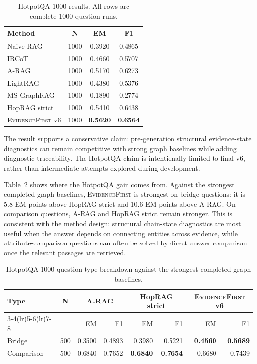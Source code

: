 \documentclass[runningheads]{llncs}
\newcommand{\sys}{\textsc{EvidenceFirst}\xspace}
\begin{document}
\begin{table}[t]
\centering
\caption{HotpotQA-1000 results. All rows are complete 1000-question runs.}
\label{tab:hotpot_main}
\small
\begin{tabular}{lccc}
\toprule
Method & N & EM & F1 \\
\midrule
Naive RAG & 1000 & 0.3920 & 0.4865 \\
IRCoT & 1000 & 0.4660 & 0.5707 \\
A-RAG & 1000 & 0.5170 & 0.6273 \\
LightRAG & 1000 & 0.4380 & 0.5376 \\
MS GraphRAG & 1000 & 0.1890 & 0.2774 \\
HopRAG strict & 1000 & 0.5410 & 0.6438 \\
\midrule
\sys v6 & 1000 & \textbf{0.5620} & \textbf{0.6564} \\
\bottomrule
\end{tabular}
\end{table}

The result supports a conservative claim: pre-generation structural
evidence-state diagnostics can remain competitive with strong graph baselines
while adding diagnostic traceability. The HotpotQA claim is intentionally
limited to final v6, rather than intermediate attempts explored during
development.

Table~\ref{tab:hotpot_types} shows where the HotpotQA gain comes from. Against
the strongest completed graph baselines, \sys is strongest on bridge questions:
it is 5.8 EM points above HopRAG strict and 10.6 EM points above A-RAG. On
comparison questions, A-RAG and HopRAG strict remain stronger. This is
consistent with the method design: structural chain-state diagnostics are most
useful when the answer depends on connecting entities across evidence, while
attribute-comparison questions can often be solved by direct answer comparison
once the relevant passages are retrieved.

\begin{table}[t]
\centering
\caption{HotpotQA-1000 question-type breakdown against the strongest completed
graph baselines.}
\label{tab:hotpot_types}
\small
\begin{tabular}{lcrrrrrr}
\toprule
Type & N & \multicolumn{2}{c}{A-RAG} & \multicolumn{2}{c}{HopRAG strict} & \multicolumn{2}{c}{\sys v6} \\
\cmidrule(lr){3-4}\cmidrule(lr){5-6}\cmidrule(lr){7-8}
 & & EM & F1 & EM & F1 & EM & F1 \\
\midrule
Bridge & 500 & 0.3500 & 0.4893 & 0.3980 & 0.5221 & \textbf{0.4560} & \textbf{0.5689} \\
Comparison & 500 & 0.6840 & 0.7652 & \textbf{0.6840} & \textbf{0.7654} & 0.6680 & 0.7439 \\
\bottomrule
\end{tabular}
\end{table}
\end{document}
